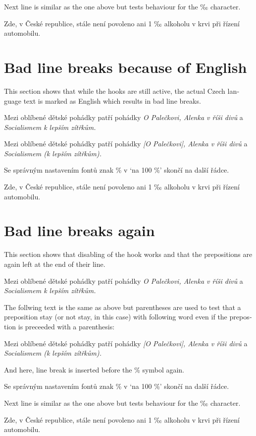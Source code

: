 \documentclass{article}
\newcommand{\expl}[1]{\begin{english}\sffamily #1\end{english}}
\begin{document}
\expl{Next line is similar as the one above but tests behaviour for the ‰
  character.}

Zde, v České republice, stále není povoleno ani 1 ‰ alkoholu v krvi při
řízení automobilu.


\section{Bad line breaks because of English}
\expl{This section shows that while the hooks are still active, the actual
  Czech language text is marked as English which results in bad line breaks.}

\begin{english}
Mezi oblíbené dětské pohádky patří pohádky \emph{O Palečkovi, Alenka v říši
  divů} a \emph{Socialismem k lepším zítřkům.}

Mezi oblíbené dětské pohádky patří pohádky \emph{[O Palečkovi], Alenka v říši
  divů} a \emph{Socialismem (k lepším zítřkům).}

Se správným nastavením fontů znak \% v `na 100 \%' skončí na další řádce.

Zde, v České republice, stále není povoleno ani 1 ‰ alkoholu v krvi při
řízení automobilu.
\end{english}


\section{Bad line breaks again}
\expl{This section shows that disabling of the hook works and that the
  prepositions are again left at the end of their line.}

\cstypoSingleLetterDisable{}
\cstypoPercentsDisable{}
\cstypoALetterDisable{}

Mezi oblíbené dětské pohádky patří pohádky \emph{O Palečkovi, Alenka v říši
  divů} a \emph{Socialismem k lepším zítřkům.}

\expl{The follwing text is the same as above but parentheses are used to test
  that a preposition stay (or not stay, in this case) with following word
  even if the prepostion is preceeded with a parenthesis:}

Mezi oblíbené dětské pohádky patří pohádky \emph{[O Palečkovi], Alenka v říši
  divů} a \emph{Socialismem (k lepším zítřkům).}

\expl{And here, line break is inserted before the \% symbol again.}

Se správným nastavením fontů znak \% v `na 100 \%' skončí na další řádce.

\expl{Next line is similar as the one above but tests behaviour for the ‰
  character.}

Zde, v České republice, stále není povoleno ani 1 ‰ alkoholu v krvi při
řízení automobilu.
\end{document}
